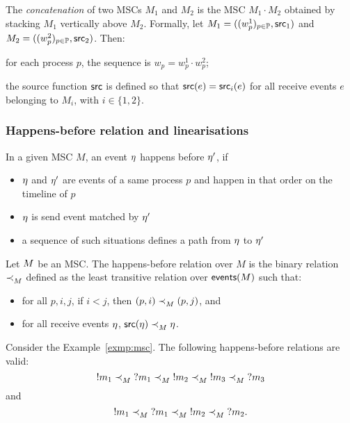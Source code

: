 The \emph{concatenation} of two MSCs $M_1$ and $M_2$ is the MSC 
$M_1 \cdot M_2$ obtained by stacking $M_1$ vertically above $M_2$. 
Formally, let 
$M_1=((w_p^1)_{p\in\mathbb{P}},\mathsf{src}_1)$ and 
$M_2=((w_p^2)_{p\in\mathbb{P}},\mathsf{src}_2)$. Then:  
\begin{inparaenum}[(i)]
   \item for each process $p$, the sequence is 
   $w_p = w_p^1 \cdot w_p^2$;  
   \item the source function $\mathsf{src}$ is defined so that 
   $\mathsf{src}(e)=\mathsf{src}_i(e)$ for all receive events $e$ belonging 
   to $M_i$, with $i\in\{1,2\}$.  
\end{inparaenum}


\subsubsection*{Happens-before relation and linearisations}
In a given MSC $M$, an event $\eta$ happens before $\eta'$, if 
 \begin{itemize}
	\item $\eta$ and $\eta'$ are events
	of a same process $p$ and happen in that order on 
	the timeline of $p$
	\item  $\eta$ is send event matched by $\eta'$
	\item a sequence of such situations defines
	a path from $\eta$ to $\eta'$
\end{itemize}

\bigskip

\begin{definition}
Let $M$ be an MSC. The happens-before relation over $M$
is the binary relation $\mathrel{\prec_{M}^{}}$ defined as 
the least transitive relation over $\mathsf{events}(M)$ such that:
\begin{itemize}
   \item for all 
   $p,i,j$, if $i<j$, then $(p,i)\mathrel{\prec_{M}^{}} (p,j)$, and
   \item for all receive events 
   $\eta$, $\mathsf{src}(\eta) \mathrel{\prec_{M}^{}} \eta$.
\end{itemize}
\end{definition}

\bigskip

\begin{example}
Consider the Example~\ref{exmp:msc}. 
The following happens-before relations are valid:
$${}!m_1{}\mathrel{\prec_{M}^{}} {}?m_1 \mathrel{\prec_{M}^{}} {}!m_2
\mathrel{\prec_{M}^{}} {}!m_3 \mathrel{\prec_{M}^{}} {}?m_3$$
and
$${}!m_1{}\mathrel{\prec_{M}^{}} {}?m_1 \mathrel{\prec_{M}^{}} {}!m_2
\mathrel{\prec_{M}^{}} {}?m_2.$$
\end{example}

